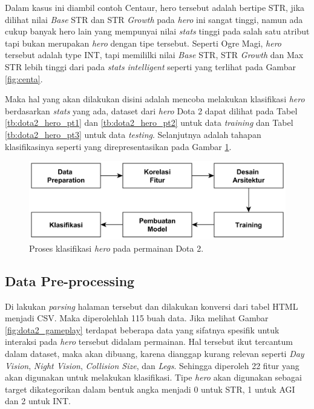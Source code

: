 Dalam kasus ini diambil contoh Centaur, hero tersebut adalah bertipe STR, jika dilihat nilai \textit{Base} STR dan STR \textit{Growth} pada \textit{hero} ini sangat tinggi, namun ada cukup banyak hero lain yang mempunyai nilai \textit{stats} tinggi pada salah satu atribut tapi bukan merupakan \textit{hero} dengan tipe tersebut. Seperti Ogre Magi, \textit{hero} tersebut adalah type INT, tapi memililki nilai \textit{Base} STR, STR \textit{Growth} dan Max STR lebih tinggi dari pada \textit{stats} \textit{intelligent} seperti yang terlihat pada Gambar \ref{fig:centa}. 
\vspace{1ex}

Maka hal yang akan dilakukan disini adalah mencoba melakukan klasifikasi \textit{hero} berdasarkan \textit{stats} yang ada, dataset dari \textit{hero} Dota 2 dapat dilihat pada Tabel \ref{tb:dota2_hero_pt1} dan \ref{tb:dota2_hero_pt2} untuk data \textit{training} dan Tabel \ref{tb:dota2_hero_pt3} untuk data \textit{testing}. Selanjutnya adalah tahapan klasifikasinya seperti yang direpresentasikan pada Gambar \ref{fig:dota2_class_proc}.
\vspace{1ex}

\begin{figure} [!h] \centering
	\includegraphics[scale=0.032]{img/dota2_nn_classification.png}
	\caption{Proses klasifikasi \textit{hero} pada permainan Dota 2.}
	\label{fig:dota2_class_proc}
\end{figure}

\subsection{Data Pre-processing}
\label{sec:sub_sec3_dota2_pre_proc}
\vspace{1ex}

Di lakukan \textit{parsing} halaman tersebut \citep{dota2020} dan dilakukan konversi dari tabel HTML menjadi CSV. Maka diperolehlah 115 buah data. Jika melihat Gambar \ref{fig:dota2_gameplay} terdapat beberapa data yang sifatnya spesifik untuk interaksi pada \textit{hero} tersebut didalam permainan. Hal tersebut ikut tercantum dalam dataset, maka akan dibuang, karena dianggap kurang relevan seperti \textit{Day Vision}, \textit{Night Vision}, \textit{Collision Size}, dan \textit{Legs}. Sehingga diperoleh 22 fitur yang akan digunakan untuk melakukan klasifikasi. Tipe \textit{hero} akan digunakan sebagai target dikategorikan dalam bentuk angka menjadi 0 untuk STR, 1 untuk AGI dan 2 untuk INT.
\vspace{1ex}

